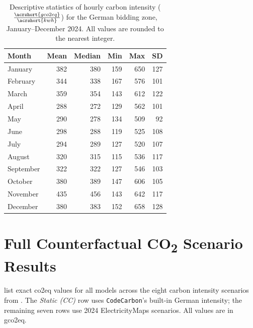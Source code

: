 \begin{table}[htbp]
\centering
\caption[Monthly carbon intensity statistics, German grid 2024.]{Descriptive statistics of hourly carbon intensity ($\frac{\acrshort{gco2eq}}{\acrshort{kwh}}$) for the German bidding zone, January--December 2024. All values are rounded to the nearest integer.}
\label{tab:app_carbon_monthly}
\begin{tabular}{@{} l r r r r r @{}}
\toprule
\textbf{Month} & \textbf{Mean} & \textbf{Median} & \textbf{Min} & \textbf{Max} & \textbf{SD} \\
\midrule
January   & 382 & 380 & 159 & 650 & 127 \\
February  & 344 & 338 & 167 & 576 & 101 \\
March     & 359 & 354 & 143 & 612 & 122 \\
April     & 288 & 272 & 129 & 562 & 101 \\
May       & 290 & 278 & 134 & 509 &  92 \\
June      & 298 & 288 & 119 & 525 & 108 \\
July      & 294 & 289 & 127 & 520 & 107 \\
August    & 320 & 315 & 115 & 536 & 117 \\
September & 322 & 322 & 127 & 546 & 103 \\
October   & 380 & 389 & 147 & 606 & 105 \\
November  & 435 & 456 & 143 & 642 & 117 \\
December  & 380 & 383 & 152 & 658 & 128 \\
\bottomrule
\end{tabular}
\end{table}


\chapter{Full Counterfactual CO\texorpdfstring{\textsubscript{2}}{2} Scenario Results}
\label{app:counterfactual}

 list exact \gls{co2eq} values for all models across the eight carbon intensity scenarios from . The \emph{Static (CC)} row uses \texttt{CodeCarbon}'s built-in German intensity; the remaining seven rows use 2024 ElectricityMaps scenarios. All values are in \gls{gco2eq}.

